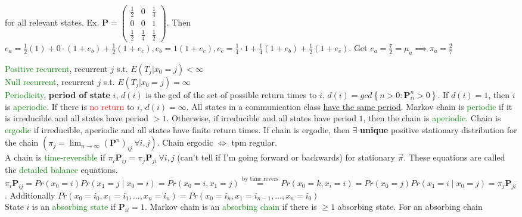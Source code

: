 \documentclass[10pt,landscape]{article}
\begin{document}
\begin{multicols*}{3}
\begin{enumerate}
  for all relevant states. Ex. $\mathbf{P} =
  \begin{pmatrix}
    \frac{1}{2} & 0 & \frac{1}{4}
    \\ 0 & 0 & 1
    \\ \frac{1}{2} & \frac{1}{4} & \frac{1}{2}
  \end{pmatrix}
$. Then $e_a = \frac{1}{2}(1) + 0 \cdot (1 + e_b) + \frac{1}{2} (1 +
e_c), e_b = 1 (1 + e_c), e_c = \frac{1}{4}\cdot 1 + \frac{1}{4}(1+
e_b) + \frac{1}{2}(1+e_c)$. Get $e_a = \frac{7}{2} = \mu_a \implies
\pi_a = \frac{2}{7}$
\end{enumerate}
\textcolor{green}{Positive recurrent}, recurrent $j$ s.t. $E(T_j | x_0
= j) < \infty$
\\ \textcolor{green}{Null recurrent}, recurrent $j$ s.t. $E(T_j | x_0
= j) = \infty$
\\ \textcolor{green}{Periodicity}, \textbf{period of state} $i$,
$d(i)$ is the gcd of the set of possible return times to $i$. $d(i) =
gcd \left\{n > 0 : \mathbf{P}_{ii}^n > 0\right\}$. If $d(i) = 1$, then
$i$ is \textcolor{green}{aperiodic}. If there is \textcolor{red}{no
  return} to $i$, $d(i) = \infty$. All states in a communication class
\underline{have the same period}. Markov chain is
\textcolor{green}{periodic} if it is irreducible and all states have
period $> 1$. Otherwise, if irreducible and all states have period
$1$, then the chain is \textcolor{green}{aperiodic}. Chain is
\textcolor{green}{ergodic} if irreducible, aperiodic and all states
have finite return times. If chain is ergodic, then $\exists$
\textbf{unique} positive stationary distribution for the chain $(\pi_j
= \lim_{n \to \infty}(\mathbf{P}^n)_{ij} \ \forall i, j)$. Chain
ergodic $\iff$ tpm regular.
\\ A chain is \textcolor{green}{time-reversible} if $\pi_i
\mathbf{P}_{ij} = \pi_j \mathbf{P}_{ji} \ \forall i,j$ (can't tell if I'm going
forward or backwards) for stationary $\vec{\pi}$. These equations are
called the \textcolor{green}{detailed balance} equations. $\pi_i
\mathbf{P}_{ij} = Pr(x_0 = i)Pr(x_1 = j \mid x_0 = i) = Pr(x_0 = i,
x_1 = j) \stackrel{\text{by time revers}}{=} Pr(x_0 = k, x_i = i) =
Pr(x_0 = j)Pr(x_1 = i \mid x_0 = j) = \pi_j
\mathbf{P}_{ji}$. Additionally $Pr(x_0 = i_0, x_1 = i_1, \ldots, x_n =
i_n) = Pr(x_0 = i_n, x_1 = i_{n-1}, \ldots, x_n = i_0)$
\\ State $i$ is an \textcolor{green}{absorbing state} if
$\mathbf{P}_{ii} = 1$. Markov chain is an \textcolor{green}{absorbing
  chain} if there is $\geq 1$ absorbing state. For an absorbing chain

\end{multicols*}
\end{document}
